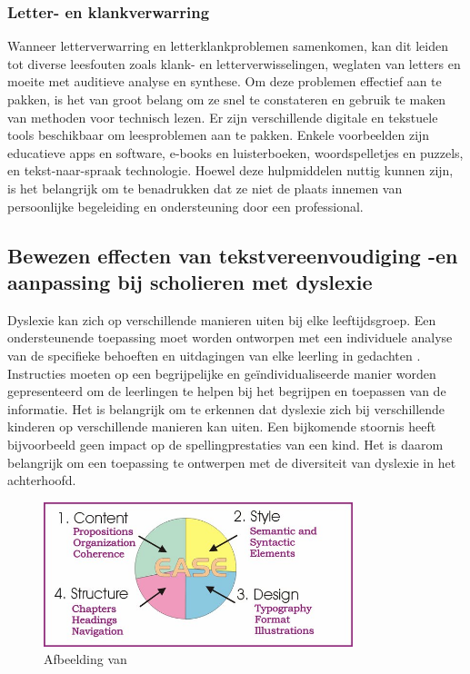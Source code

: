 \subsubsection{Letter- en klankverwarring}

Wanneer letterverwarring en letterklankproblemen samenkomen, kan dit leiden tot diverse leesfouten zoals klank- en letterverwisselingen, weglaten van letters en moeite met auditieve analyse en synthese. Om deze problemen effectief aan te pakken, is het van groot belang om ze snel te constateren en gebruik te maken van methoden voor technisch lezen. Er zijn verschillende digitale en tekstuele tools beschikbaar om leesproblemen aan te pakken. Enkele voorbeelden zijn educatieve apps en software, e-books en luisterboeken, woordspelletjes en puzzels, en tekst-naar-spraak technologie. Hoewel deze hulpmiddelen nuttig kunnen zijn, is het belangrijk om te benadrukken dat ze niet de plaats innemen van persoonlijke begeleiding en ondersteuning door een professional.

\subsection{Bewezen effecten van tekstvereenvoudiging -en aanpassing bij scholieren met dyslexie}

Dyslexie kan zich op verschillende manieren uiten bij elke leeftijdsgroep. Een ondersteunende toepassing moet worden ontworpen met een individuele analyse van de specifieke behoeften en uitdagingen van elke leerling in gedachten \autocite{Gooding2022}. Instructies moeten op een begrijpelijke en geïndividualiseerde manier worden gepresenteerd om de leerlingen te helpen bij het begrijpen en toepassen van de informatie. Het is belangrijk om te erkennen dat dyslexie zich bij verschillende kinderen op verschillende manieren kan uiten. Een bijkomende stoornis heeft bijvoorbeeld geen impact op de spellingprestaties van een kind. Het is daarom belangrijk om een toepassing te ontwerpen met de diversiteit van dyslexie in het achterhoofd.

\begin{figure}[H]
	\begin{center}
		\includegraphics[width=9cm]{img/text-simplification-reading-ease.png}
	\end{center}
	\caption{Afbeelding van \textcite{Dubay2004}}
\end{figure}


